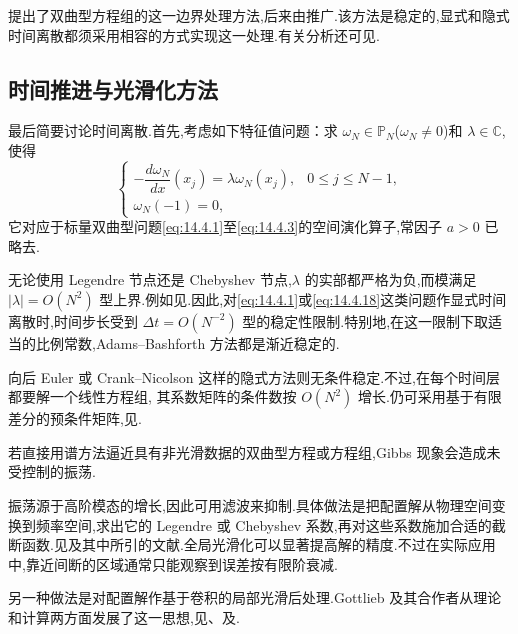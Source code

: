 提出了双曲型方程组的这一边界处理方法,后来由推广.该方法是稳定的,显式和隐式时间离散都须采用相容的方式实现这一处理.有关分析还可见.

\subsection{时间推进与光滑化方法}\label{sec:14.4.3}

最后简要讨论时间离散.首先,考虑如下特征值问题：求 \(\omega_N\in\mathbb P_N\)(\(\omega_N\ne0\))和 \(\lambda\in\mathbb C\),使得
\begin{equation}\label{eq:14.4.25}
  \begin{cases}
    -\dfrac{d\omega_N}{dx}(x_j)=\lambda\omega_N(x_j),
        &0\le j\le N-1,\\[2pt]
    \omega_N(-1)=0,
  \end{cases}
\end{equation}
它对应于标量双曲型问题\eqref{eq:14.4.1}至\eqref{eq:14.4.3}的空间演化算子,常因子 \(a>0\) 已略去.

无论使用 Legendre 节点还是 Chebyshev 节点,\(\lambda\) 的实部都严格为负,而模满足 \(|\lambda|=O(N^2)\) 型上界.例如见.因此,对\eqref{eq:14.4.1}或\eqref{eq:14.4.18}这类问题作显式时间离散时,时间步长受到 \(\Delta t=O(N^{-2})\) 型的稳定性限制.特别地,在这一限制下取适当的比例常数,Adams--Bashforth 方法都是渐近稳定的.

向后 Euler 或 Crank--Nicolson 这样的隐式方法则无条件稳定.不过,在每个时间层都要解一个线性方程组,
其系数矩阵的条件数按 \(O(N^2)\) 增长.仍可采用基于有限差分的预条件矩阵,见.

若直接用谱方法逼近具有非光滑数据的双曲型方程或方程组,Gibbs 现象会造成未受控制的振荡.

振荡源于高阶模态的增长,因此可用滤波来抑制.具体做法是把配置解从物理空间变换到频率空间,求出它的 Legendre 或 Chebyshev 系数,再对这些系数施加合适的截断函数.见及其中所引的文献.全局光滑化可以显著提高解的精度.不过在实际应用中,靠近间断的区域通常只能观察到误差按有限阶衰减.

另一种做法是对配置解作基于卷积的局部光滑后处理.Gottlieb 及其合作者从理论和计算两方面发展了这一思想,见、及.

